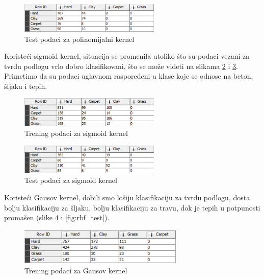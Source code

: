 \documentclass[a4paper]{article}
\begin{document}
\begin{figure}[H]
	\begin{center}
		\includegraphics[width=0.6\textwidth]{Klasifikacija/SVM/poly_test}
	\end{center}
	\caption{Test podaci za polinomijalni kernel}
	\label{fig:poly_test}
\end{figure}


Koristeći sigmoid kernel, situacija se promenila utoliko što su podaci vezani za tvrdu podlogu
vrlo dobro klasifikovani, što se može videti na slikama \ref{fig:sigmoid_training} i \ref{fig:sigmoid_test}.
Primetimo da su podaci uglavnom raspoređeni u klase koje se odnose na beton, šljaku i tepih.

\begin{figure}[H]
	\begin{center}
		\includegraphics[width=0.6\textwidth]{Klasifikacija/SVM/sigmoid_training}
	\end{center}
	\caption{Trening podaci za sigmoid kernel}
	\label{fig:sigmoid_training}
\end{figure}

\begin{figure}[H]
	\begin{center}
		\includegraphics[width=0.6\textwidth]{Klasifikacija/SVM/sigmoid_test}
	\end{center}
	\caption{Test podaci za sigmoid kernel}
	\label{fig:sigmoid_test}
\end{figure}

Koristeći Gausov kernel, dobili smo lošiju klasifikaciju za tvrdu podlogu, dosta bolju klasifikaciju za šljaku, bolju klasifikaciju za travu, dok
je tepih u potpunosti promašen (slike \ref{fig:rbf_training} i \ref{fig:rbf_test}).\\

\begin{figure}[H]
	\begin{center}
		\includegraphics[width=0.7\textwidth]{Klasifikacija/SVM/rbf_training}
	\end{center}
	\caption{Trening podaci za Gausov kernel}
	\label{fig:rbf_training}
\end{figure}
\end{document}
